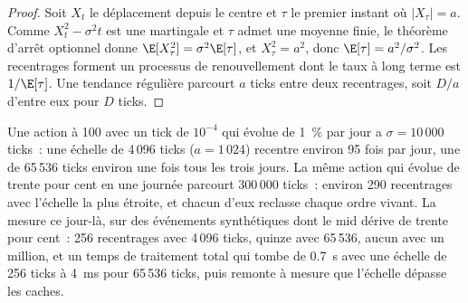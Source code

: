 \begin{proof}
Soit $X_t$ le déplacement depuis le centre et $\tau$ le premier instant où $|X_\tau| = a$. Comme $X_t^2 - \sigma^2 t$ est une martingale et
$\tau$ admet une moyenne finie, le théorème d'arrêt optionnel donne $\E[X_\tau^2] = \sigma^2 \E[\tau]$, et $X_\tau^2 = a^2$, donc $\E[\tau] =
a^2/\sigma^2$. Les recentrages forment un processus de renouvellement dont le taux à long terme est $1/\E[\tau]$. Une tendance régulière parcourt $a$ ticks
entre deux recentrages, soit $D/a$ d'entre eux pour $D$ ticks.
\end{proof}

Une action à 100 avec un tick de $10^{-4}$ qui évolue de 1~\% par jour a $\sigma = 10\,000$ ticks~: une échelle de 4\,096 ticks
($a = 1\,024$) recentre environ 95 fois par jour, une de 65\,536 ticks environ une fois tous les trois jours. La même action qui évolue de trente
pour cent en une journée parcourt 300\,000 ticks~: environ 290 recentrages avec l'échelle la plus étroite, et chacun d'eux reclasse chaque
ordre vivant. La 
mesure ce jour-là, sur des événements synthétiques dont le mid dérive de trente pour cent~: 256 recentrages avec 4\,096 ticks, quinze avec
65\,536, aucun avec un million, et un temps de traitement total qui tombe de \qty{0.7}{\second} avec une échelle de 256 ticks à
\qty{4}{\milli\second} pour 65\,536 ticks, puis remonte à mesure que l'échelle dépasse les caches.

\begin{omfigure}

\label{fig:ll:the-order-book-builder:width}
\end{omfigure}

